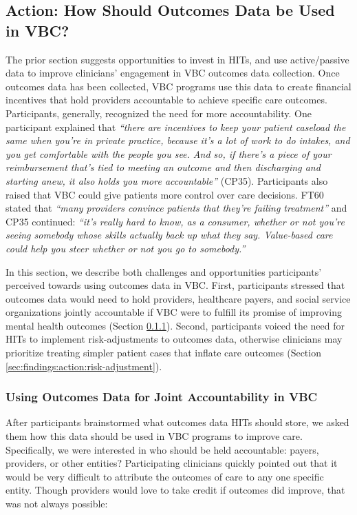\subsection{Action: How Should Outcomes Data be Used in VBC?}
\label{sec:findings:action}

The prior section suggests opportunities to invest in HITs, and use active/passive data to improve clinicians' engagement in VBC outcomes data collection.
Once outcomes data has been collected, VBC programs use this data to create financial incentives that hold providers accountable to achieve specific care outcomes.
Participants, generally, recognized the need for more accountability.
One participant explained that \textit{``there are incentives to keep your patient caseload the same when you're in private practice, because it's a lot of work to do intakes, and you get comfortable with the people you see. 
And so, if there's a piece of your reimbursement that's tied to meeting an outcome and then discharging and starting anew, it also holds you more accountable''} (CP35).
Participants also raised that VBC could give patients more control over care decisions.
FT60 stated that \textit{``many providers convince patients that they're failing treatment''} and CP35 continued: \textit{``it's really hard to know, as a consumer, whether or not you're seeing somebody whose skills actually back up what they say. 
Value-based care could help you steer whether or not you go to somebody.''}

In this section, we describe both challenges and opportunities participants' perceived towards using outcomes data in VBC.
First, participants stressed that outcomes data would need to hold providers, healthcare payers, and social service organizations jointly accountable if VBC were to fulfill its promise of improving mental health outcomes (Section \ref{sec:findings:action:accountability}).
Second, participants voiced the need for HITs to implement risk-adjustments to outcomes data, otherwise clinicians may prioritize treating simpler patient cases that inflate care outcomes (Section \ref{sec:findings:action:risk-adjustment}).

\subsubsection{Using Outcomes Data for Joint Accountability in VBC}
\label{sec:findings:action:accountability}

After participants brainstormed what outcomes data HITs should store, we asked them how this data should be used in VBC programs to improve care.
Specifically, we were interested in who should be held accountable: payers, providers, or other entities?
Participating clinicians quickly pointed out that it would be very difficult to attribute the outcomes of care to any one specific entity.
Though providers would love to take credit if outcomes did improve, that was not always possible:

